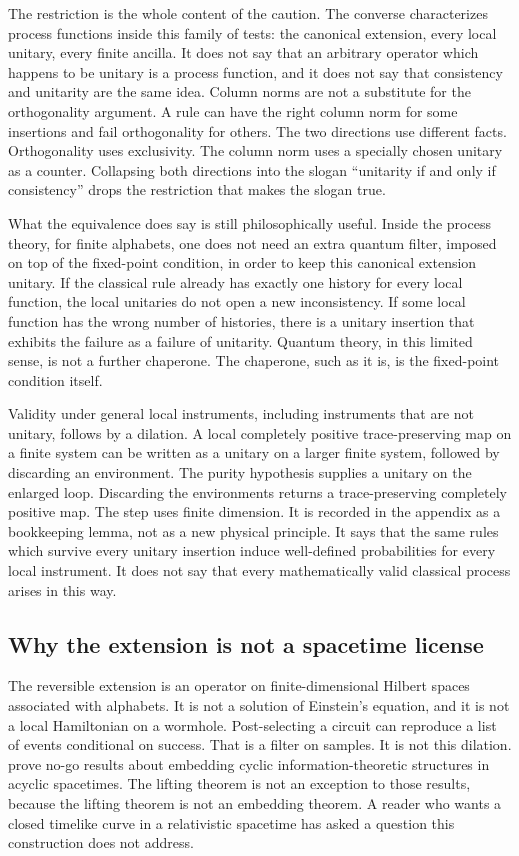 \documentclass[11pt]{article}
\begin{document}
The restriction is the whole content of the caution. The converse characterizes process functions inside this family of tests: the canonical extension, every local unitary, every finite ancilla. It does not say that an arbitrary operator which happens to be unitary is a process function, and it does not say that consistency and unitarity are the same idea. Column norms are not a substitute for the orthogonality argument. A rule can have the right column norm for some insertions and fail orthogonality for others. The two directions use different facts. Orthogonality uses exclusivity. The column norm uses a specially chosen unitary as a counter. Collapsing both directions into the slogan ``unitarity if and only if consistency'' drops the restriction that makes the slogan true.

What the equivalence does say is still philosophically useful. Inside the process theory, for finite alphabets, one does not need an extra quantum filter, imposed on top of the fixed-point condition, in order to keep this canonical extension unitary. If the classical rule already has exactly one history for every local function, the local unitaries do not open a new inconsistency. If some local function has the wrong number of histories, there is a unitary insertion that exhibits the failure as a failure of unitarity. Quantum theory, in this limited sense, is not a further chaperone. The chaperone, such as it is, is the fixed-point condition itself.

Validity under general local instruments, including instruments that are not unitary, follows by a dilation. A local completely positive trace-preserving map on a finite system can be written as a unitary on a larger finite system, followed by discarding an environment. The purity hypothesis supplies a unitary on the enlarged loop. Discarding the environments returns a trace-preserving completely positive map. The step uses finite dimension. It is recorded in the appendix as a bookkeeping lemma, not as a new physical principle. It says that the same rules which survive every unitary insertion induce well-defined probabilities for every local instrument. It does not say that every mathematically valid classical process arises in this way.

\subsection{Why the extension is not a spacetime license}
\label{sec:nogo}

The reversible extension is an operator on finite-dimensional Hilbert spaces associated with alphabets. It is not a solution of Einstein's equation, and it is not a local Hamiltonian on a wormhole. Post-selecting a circuit can reproduce a list of events conditional on success. That is a filter on samples. It is not this dilation. \citet{vilasini2024} prove no-go results about embedding cyclic information-theoretic structures in acyclic spacetimes. The lifting theorem is not an exception to those results, because the lifting theorem is not an embedding theorem. A reader who wants a closed timelike curve in a relativistic spacetime has asked a question this construction does not address.
\end{document}
